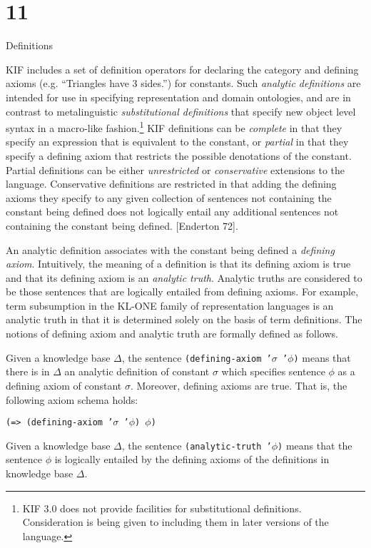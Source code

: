 \vfill\eject

\chapter{11}{Definitions}

KIF includes a set of definition operators for declaring the category and 
defining axioms (e.g. ``Triangles have 3 sides.'') for constants.  Such {\it 
analytic definitions} are intended for use in specifying representation and 
domain ontologies, and are in contrast to metalinguistic {\it substitutional 
definitions} that specify new object level syntax in a macro-like 
fashion.\footnote*{KIF 3.0 does not provide facilities for substitutional 
definitions.  Consideration is being given to including them in later versions
of the language.}  KIF definitions can be {\it complete} in that they specify an 
expression that is equivalent to the constant, or {\it partial} in that they 
specify a defining axiom that restricts the possible denotations of the
constant.  Partial definitions can be either {\it unrestricted} or {\it conservative} 
extensions to the language.  Conservative definitions are restricted in that
adding the defining axioms they specify to any given collection of sentences
not containing the constant being defined does not logically entail any
additional sentences not containing the constant being defined. [Enderton 
72].

An analytic definition associates with the constant being defined a {\it 
defining axiom}.  Intuitively, the meaning of a definition is that its
defining 
axiom is true and that its defining axiom is an {\it analytic truth}. 
Analytic 
truths are considered to be those sentences that are logically entailed from 
defining axioms.  For example, term subsumption in the KL-ONE family of 
representation languages is an analytic truth in that it is determined solely
on 
the basis of term definitions.  The notions of defining axiom and analytic
truth are formally defined as follows.  

Given a knowledge base $\Delta$, the sentence {\tt (defining-axiom '$\sigma$ 
'$\phi$)} means that there is in $\Delta$ an analytic definition of constant 
$\sigma$ which specifies sentence $\phi$ as a defining axiom of constant $\sigma$.  
Moreover, defining axioms are true.  That is, the following axiom schema 
holds:

\medskip
{\tt (=> (defining-axiom '$\sigma$ '$\phi$) $\phi$)}
\medskip

Given a knowledge base $\Delta$, the sentence {\tt (analytic-truth '$\phi$)} 
means that the sentence $\phi$ is logically entailed by the defining axioms of
the definitions in knowledge base $\Delta$.

